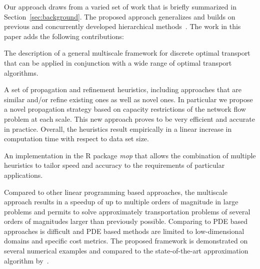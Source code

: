 \documentclass[twoside,11pt]{article}
\begin{document}
Our approach draws from a varied set of work that is briefly summarized in
Section~\ref{sec:background}. The proposed approach generalizes and builds on
previous and concurrently developed hierarchical
methods~\citep{glimm:arxiv2011,schmitzer2013hierarchical,schmitzer2015sparse,oberman2015efficient}.
The work in this paper adds the following contributions:
\begin{compactitem}
\item The description of a general multiscale framework for discrete optimal
  transport that can be applied in conjunction with a wide range of optimal
  transport algorithms.
\item A set of propagation and refinement heuristics, including approaches
  that are similar and/or refine existing ones
  \citep{glimm:arxiv2011,oberman2015efficient,schmitzer2015sparse} as well as
  novel ones. In particular we propose a novel propagation strategy based on
  capacity restrictions of the network flow problem at each scale. This new
  approach proves to be very efficient and accurate in practice. Overall, the
  heuristics result empirically in a linear increase in computation time with
  respect to data set size.  
\item An implementation in the R package {\em mop} that allows the combination
  of multiple heuristics to tailor speed and accuracy to the requirements of
  particular applications.
\end{compactitem}
Compared to other linear programming based approaches, the multiscale approach results
in a speedup of up to multiple orders of magnitude in large problems and
permits to solve approximately transportation problems of several orders of
magnitudes larger than previously possible. Comparing to PDE based approaches
is difficult and PDE based methods are limited to low-dimensional domains and
specific cost metrics. The proposed framework is demonstrated on several
numerical examples and compared to the state-of-the-art approximation algorithm
by~\citet{cuturi:nips2013}. 
\end{document}
